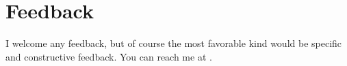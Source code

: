 \section{Feedback}
\label{sec:feedback}

I welcome any feedback, but of course the most favorable kind would be specific and constructive feedback.
You can reach me at .


